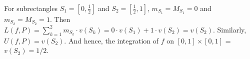 \begin{solution}
    For subrectangles $S_1=\left[0,
    \frac{1}{2}\right]$
    and $S_2=\left[\frac{1}{2}, 1\right]$,
    $m_{S_1}=M_{S_1}=0$ and
    $m_{S_2}=M_{S_2}=1$. Then $L(f,P)=\sum_
    {k=1}^2{m_{S_k}\cdot v(S_k)}=0\cdot v(S_1)
    +1\cdot v(S_2)=v(S_2).$ Similarly, $U(f,P)
    =v(S_2)$. And hence, the integration of
    $f$ on $[0,1]\times[0,1]$ = $v(S_2)=1/2$.
\end{solution}